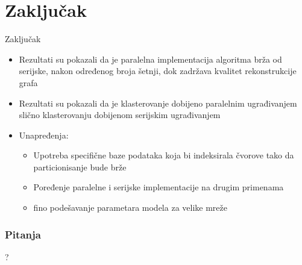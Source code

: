 \documentclass{beamer}
\begin{document}
\section{Zaključak}
\begin{frame}{Zaključak}
    \begin{itemize}
        \item Rezultati su pokazali da je paralelna implementacija algoritma brža od serijske, nakon određenog broja šetnji, dok zadržava kvalitet rekonstrukcije grafa
        \item Rezultati su pokazali da je klasterovanje dobijeno paralelnim ugrađivanjem slično klasterovanju dobijenom serijskim ugrađivanjem
        \item Unapređenja:
        \begin{itemize}
            \item Upotreba specifične baze podataka koja bi indeksirala čvorove tako da particionisanje bude brže
            \item Poređenje paralelne i serijske implementacije na drugim primenama
            \item fino podešavanje parametara modela za velike mreže 
        \end{itemize}
    \end{itemize}
\end{frame}



\begin{frame}
	\frametitle{Pitanja}
	\begin{center}
		\huge{?}
	\end{center}
\end{frame}
\end{document}
